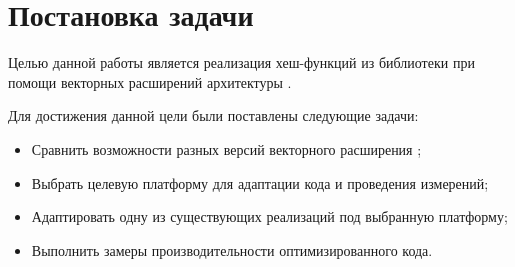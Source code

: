 
\section{Постановка задачи}
\label{sec:task}
Целью данной работы является реализация хеш-функций из библиотеки \xxHash{} при помощи векторных расширений архитектуры \riscv{}.

Для достижения данной цели были поставлены следующие задачи:
\begin{itemize}
	\item Сравнить возможности разных версий векторного расширения \riscv{};
	\item Выбрать целевую платформу для адаптации кода и проведения измерений;
	\item Адаптировать одну из существующих реализаций под выбранную платформу;
	\item Выполнить замеры производительности оптимизированного кода.
\end{itemize}
